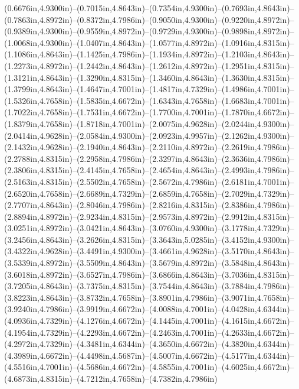 (0.6676in,4.9300in)--(0.7015in,4.8643in)--(0.7354in,4.9300in)--(0.7693in,4.8643in)--(0.7863in,4.8972in)--(0.8372in,4.7986in)--(0.9050in,4.9300in)--(0.9220in,4.8972in)--(0.9389in,4.9300in)--(0.9559in,4.8972in)--(0.9729in,4.9300in)--(0.9898in,4.8972in)--(1.0068in,4.9300in)--(1.0407in,4.8643in)--(1.0577in,4.8972in)--(1.0916in,4.8315in)--(1.1086in,4.8643in)--(1.1425in,4.7986in)--(1.1934in,4.8972in)--(1.2103in,4.8643in)--(1.2273in,4.8972in)--(1.2442in,4.8643in)--(1.2612in,4.8972in)--(1.2951in,4.8315in)--(1.3121in,4.8643in)--(1.3290in,4.8315in)--(1.3460in,4.8643in)--(1.3630in,4.8315in)--(1.3799in,4.8643in)--(1.4647in,4.7001in)--(1.4817in,4.7329in)--(1.4986in,4.7001in)--(1.5326in,4.7658in)--(1.5835in,4.6672in)--(1.6343in,4.7658in)--(1.6683in,4.7001in)--(1.7022in,4.7658in)--(1.7531in,4.6672in)--(1.7700in,4.7001in)--(1.7870in,4.6672in)--(1.8379in,4.7658in)--(1.8718in,4.7001in)--(2.0075in,4.9628in)--(2.0244in,4.9300in)--(2.0414in,4.9628in)--(2.0584in,4.9300in)--(2.0923in,4.9957in)--(2.1262in,4.9300in)--(2.1432in,4.9628in)--(2.1940in,4.8643in)--(2.2110in,4.8972in)--(2.2619in,4.7986in)--(2.2788in,4.8315in)--(2.2958in,4.7986in)--(2.3297in,4.8643in)--(2.3636in,4.7986in)--(2.3806in,4.8315in)--(2.4145in,4.7658in)--(2.4654in,4.8643in)--(2.4993in,4.7986in)--(2.5163in,4.8315in)--(2.5502in,4.7658in)--(2.5672in,4.7986in)--(2.6181in,4.7001in)--(2.6520in,4.7658in)--(2.6689in,4.7329in)--(2.6859in,4.7658in)--(2.7029in,4.7329in)--(2.7707in,4.8643in)--(2.8046in,4.7986in)--(2.8216in,4.8315in)--(2.8386in,4.7986in)--(2.8894in,4.8972in)--(2.9234in,4.8315in)--(2.9573in,4.8972in)--(2.9912in,4.8315in)--(3.0251in,4.8972in)--(3.0421in,4.8643in)--(3.0760in,4.9300in)--(3.1778in,4.7329in)--(3.2456in,4.8643in)--(3.2626in,4.8315in)--(3.3643in,5.0285in)--(3.4152in,4.9300in)--(3.4322in,4.9628in)--(3.4491in,4.9300in)--(3.4661in,4.9628in)--(3.5170in,4.8643in)--(3.5339in,4.8972in)--(3.5509in,4.8643in)--(3.5679in,4.8972in)--(3.5848in,4.8643in)--(3.6018in,4.8972in)--(3.6527in,4.7986in)--(3.6866in,4.8643in)--(3.7036in,4.8315in)--(3.7205in,4.8643in)--(3.7375in,4.8315in)--(3.7544in,4.8643in)--(3.7884in,4.7986in)--(3.8223in,4.8643in)--(3.8732in,4.7658in)--(3.8901in,4.7986in)--(3.9071in,4.7658in)--(3.9240in,4.7986in)--(3.9919in,4.6672in)--(4.0088in,4.7001in)--(4.0428in,4.6344in)--(4.0936in,4.7329in)--(4.1276in,4.6672in)--(4.1445in,4.7001in)--(4.1615in,4.6672in)--(4.1954in,4.7329in)--(4.2293in,4.6672in)--(4.2463in,4.7001in)--(4.2633in,4.6672in)--(4.2972in,4.7329in)--(4.3481in,4.6344in)--(4.3650in,4.6672in)--(4.3820in,4.6344in)--(4.3989in,4.6672in)--(4.4498in,4.5687in)--(4.5007in,4.6672in)--(4.5177in,4.6344in)--(4.5516in,4.7001in)--(4.5686in,4.6672in)--(4.5855in,4.7001in)--(4.6025in,4.6672in)--(4.6873in,4.8315in)--(4.7212in,4.7658in)--(4.7382in,4.7986in) 